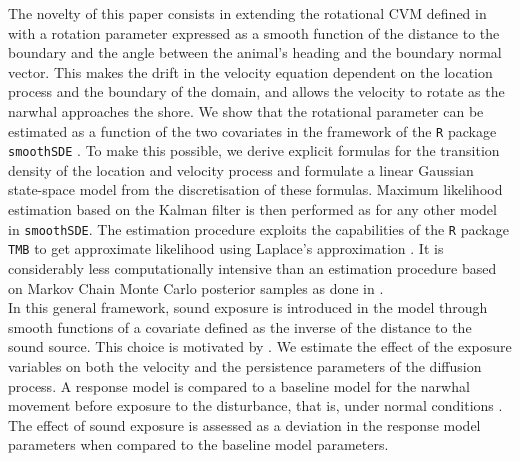 \documentclass[aoas]{imsart}
\theoremstyle{definition}
\theoremstyle{remark}
\theoremstyle{remark}
\newcommand {\1}{\mathbb{1}}
\begin{document}
The novelty of this paper consists in extending the rotational CVM defined in \citep{gurarie_correlated_2017} with a rotation parameter expressed as a smooth function of the distance to the boundary and the angle between the animal's heading and the boundary normal vector. This makes the drift in the velocity equation dependent on the location process and the boundary of the domain, and allows the velocity to rotate as the narwhal approaches the shore. We show that the rotational parameter can be estimated as a function of the two covariates in the framework of the \texttt{R} package \texttt{smoothSDE} \citep{michelot_varying-coefficient_2021}. To make this possible, we derive explicit formulas for the transition density of the location and velocity process and formulate a linear Gaussian state-space model from the discretisation of these formulas. Maximum likelihood estimation based on the Kalman filter is then performed as for any other model in \texttt{smoothSDE}. The estimation procedure exploits the capabilities of the \texttt{R} package \texttt{TMB} to get approximate likelihood using Laplace's approximation \citep{kristensen_tmb_2016,albertsen_fast_2015}. It is considerably less computationally intensive than an estimation procedure based on Markov Chain Monte Carlo posterior samples as done in \citep{hanks_reflected_2017,russell_spatially_2018}.\\

In this general framework, sound exposure is introduced in the model through smooth functions of a covariate defined as the inverse of the distance to the sound source. This choice is motivated by \citep{heide-jorgensen_behavioral_2021, tervo_narwhals_2021,tervo_stuck_2023}.  We estimate the effect of the exposure variables on both the velocity and the persistence parameters of the diffusion process.  A response model is compared to a baseline model for the narwhal movement before exposure to the disturbance, that is, under normal conditions \citep{michelot_continuous-time_2022}. The effect of sound exposure is assessed as a deviation in the response model parameters when compared to the baseline model parameters. 
\\
\end{document}
